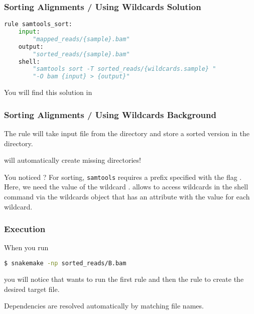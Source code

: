 \begin{frame}[fragile]
  \frametitle{Sorting Alignments / Using Wildcards Solution}
  \begin{lstlisting}[language=Python,style=Python]
rule samtools_sort:
    input:
        "mapped_reads/{sample}.bam"
    output:
        "sorted_reads/{sample}.bam"
    shell:
        "samtools sort -T sorted_reads/{wildcards.sample} "
        "-O bam {input} > {output}"
  \end{lstlisting}
  You will find this solution in 
\end{frame}

\begin{frame}[fragile]
  \frametitle{Sorting Alignments / Using Wildcards Background}
  The rule will take  input file from the  directory and store a sorted version in the  directory.
  \pause
  \begin{docs}
  	\Snakemake{} will automatically create missing directories!
  \end{docs}
  You noticed ? 
  \pause
  For sorting, \texttt{samtools} requires a prefix specified with the flag . Here, we need the value of the wildcard . \Snakemake{} allows to access wildcards in the shell command via the wildcards object that has an attribute with the value for each wildcard.
\end{frame}

\begin{frame}[fragile]
  \frametitle{Execution}
  When you run 
  \begin{lstlisting}[language=Bash, style=Shell]
$ snakemake -np sorted_reads/B.bam
  \end{lstlisting}
  you will notice that \Snakemake{} wants to run the first rule  and then the rule  to create the desired target file.
  \begin{docs}
  	Dependencies are resolved automatically by matching file names.
  \end{docs}
\end{frame}

